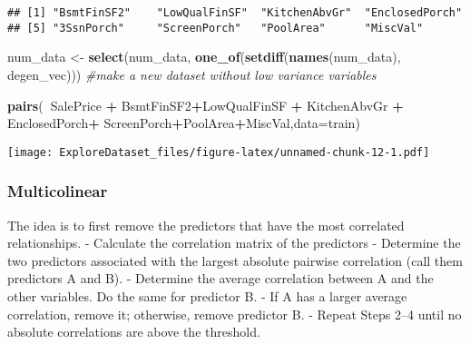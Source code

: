 \documentclass[]{article}
\newenvironment{Shaded}{\begin{snugshade}}{\end{snugshade}}
\newcommand{\CommentTok}[1]{\textcolor[rgb]{0.56,0.35,0.01}{\textit{#1}}}
\newcommand{\DataTypeTok}[1]{\textcolor[rgb]{0.13,0.29,0.53}{#1}}
\newcommand{\KeywordTok}[1]{\textcolor[rgb]{0.13,0.29,0.53}{\textbf{#1}}}
\newcommand{\NormalTok}[1]{#1}
\newcommand{\OperatorTok}[1]{\textcolor[rgb]{0.81,0.36,0.00}{\textbf{#1}}}
\newcommand{\StringTok}[1]{\textcolor[rgb]{0.31,0.60,0.02}{#1}}
\begin{document}
\begin{verbatim}
## [1] "BsmtFinSF2"    "LowQualFinSF"  "KitchenAbvGr"  "EnclosedPorch"
## [5] "3SsnPorch"     "ScreenPorch"   "PoolArea"      "MiscVal"
\end{verbatim}

\begin{Shaded}
\begin{Highlighting}[]
\NormalTok{num_data <-}\StringTok{ }\KeywordTok{select}\NormalTok{(num_data, }\KeywordTok{one_of}\NormalTok{(}\KeywordTok{setdiff}\NormalTok{(}\KeywordTok{names}\NormalTok{(num_data), degen_vec))) }\CommentTok{#make a new dataset without low variance variables}
\end{Highlighting}
\end{Shaded}

\begin{Shaded}
\begin{Highlighting}[]
\KeywordTok{pairs}\NormalTok{(}\OperatorTok{~}\NormalTok{SalePrice }\OperatorTok{+}\StringTok{ }\NormalTok{BsmtFinSF2}\OperatorTok{+}\NormalTok{LowQualFinSF }\OperatorTok{+}\StringTok{ }\NormalTok{KitchenAbvGr }\OperatorTok{+}\StringTok{ }\NormalTok{EnclosedPorch}\OperatorTok{+}\StringTok{ }\NormalTok{ScreenPorch}\OperatorTok{+}\NormalTok{PoolArea}\OperatorTok{+}\NormalTok{MiscVal,}\DataTypeTok{data=}\NormalTok{train)}
\end{Highlighting}
\end{Shaded}

\texttt{[image: ExploreDataset\_files/figure-latex/unnamed-chunk-12-1.pdf]}

\hypertarget{multicolinear}{%
\subsubsection{Multicolinear}\label{multicolinear}}

The idea is to first remove the predictors that have the most correlated
relationships. - Calculate the correlation matrix of the predictors -
Determine the two predictors associated with the largest absolute
pairwise correlation (call them predictors A and B). - Determine the
average correlation between A and the other variables. Do the same for
predictor B. - If A has a larger average correlation, remove it;
otherwise, remove predictor B. - Repeat Steps 2--4 until no absolute
correlations are above the threshold.
\end{document}
